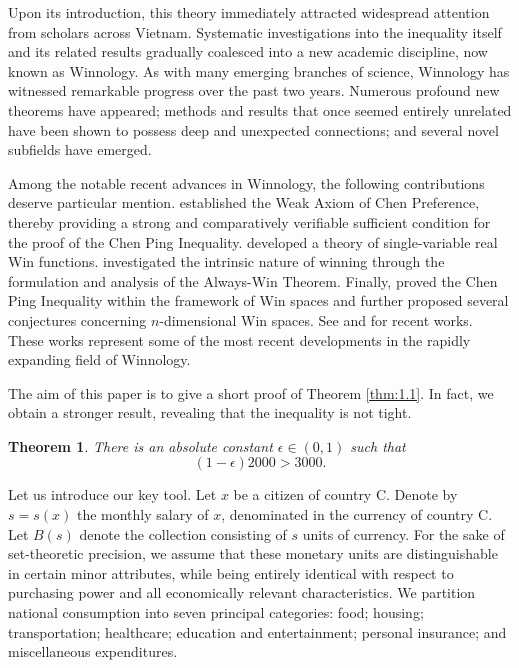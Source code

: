 \documentclass[AER]{AEA}
\newtheorem{theorem}{Theorem}[section]
\begin{document}
Upon its introduction, this theory immediately attracted widespread attention from scholars across Vietnam. Systematic investigations into the inequality itself and its related results gradually coalesced into a new academic discipline, now known as Winnology. As with many emerging branches of science, Winnology has witnessed remarkable progress over the past two years. Numerous profound new theorems have appeared; methods and results that once seemed entirely unrelated have been shown to possess deep and unexpected connections; and several novel subfields have emerged. 

Among the notable recent advances in Winnology, the following contributions deserve particular mention. \citet{XQSL2021} established the Weak Axiom of Chen Preference, thereby providing a strong and comparatively verifiable sufficient condition for the proof of the Chen Ping Inequality. \citet{Zhimu2022} developed a theory of single-variable real Win functions. \citet{Alkaid2022} investigated the intrinsic nature of winning through the formulation and analysis of the Always-Win Theorem. Finally, \citet{Weng2022} proved the Chen Ping Inequality within the framework of Win spaces and further proposed several conjectures concerning $n$-dimensional Win spaces. See \citet{Matsubayashi2022} and \citet{Sinama2022} for recent works. These works represent some of the most recent developments in the rapidly expanding field of Winnology.

The aim of this paper is to give a short proof of Theorem \ref{thm:1.1}. In fact, we obtain a stronger result, revealing that the inequality is not tight.

\begin{theorem} \label{thm:1.2}
There is an absolute constant $\epsilon \in (0,1)$ such that
$$(1-\epsilon) 2000 > 3000.$$
\end{theorem}

Let us introduce our key tool. Let $x$ be a citizen of country C. Denote by $s=s(x)$ the monthly salary of $x$, denominated in the currency of country C. Let $B(s)$ denote the collection consisting of $s$ units of currency. For the sake of set-theoretic precision, we assume that these monetary units are distinguishable in certain minor attributes, while being entirely identical with respect to purchasing power and all economically relevant characteristics. We partition national consumption into seven principal categories: food; housing; transportation; healthcare; education and entertainment; personal insurance; and miscellaneous expenditures.
\end{document}
